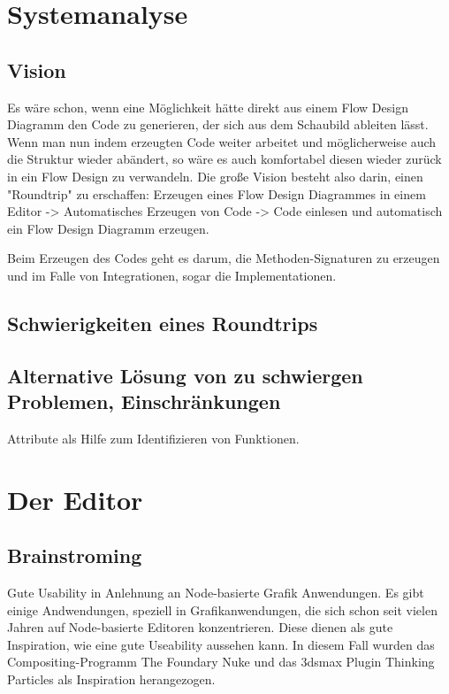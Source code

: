 \documentclass[11pt]{article}
\date{\today}
\title{}
\begin{document}
\tableofcontents

\section{Systemanalyse}
\label{sec:orgheadline4}

\subsection{Vision}
\label{sec:orgheadline1}
Es wäre schon, wenn eine Möglichkeit hätte direkt aus einem Flow Design Diagramm den Code zu generieren, der sich aus dem Schaubild ableiten lässt.
Wenn man nun indem erzeugten Code weiter arbeitet und möglicherweise auch die Struktur wieder abändert, so wäre es auch komfortabel diesen wieder zurück in ein Flow Design zu 
verwandeln.
Die große Vision besteht also darin, einen "Roundtrip" zu erschaffen:
Erzeugen eines Flow Design Diagrammes in einem Editor -> Automatisches Erzeugen von Code -> Code einlesen und automatisch ein Flow Design Diagramm erzeugen.

Beim Erzeugen des Codes geht es darum, die Methoden-Signaturen zu erzeugen und im Falle von Integrationen, sogar die Implementationen.

\subsection{Schwierigkeiten eines Roundtrips}
\label{sec:orgheadline2}


\subsection{Alternative Lösung von zu schwiergen Problemen, Einschränkungen}
\label{sec:orgheadline3}
Attribute als Hilfe zum Identifizieren von Funktionen.

\section{Der Editor}
\label{sec:orgheadline8}
\subsection{Brainstroming}
\label{sec:orgheadline6}
Gute Usability in Anlehnung an Node-basierte Grafik Anwendungen.
Es gibt einige Andwendungen, speziell in Grafikanwendungen, die sich schon seit vielen Jahren auf Node-basierte Editoren konzentrieren.
Diese dienen als gute Inspiration, wie eine gute Useability aussehen kann.
In diesem Fall wurden das Compositing-Programm The Foundary Nuke und das 3dsmax Plugin Thinking Particles als Inspiration herangezogen.
\end{document}
